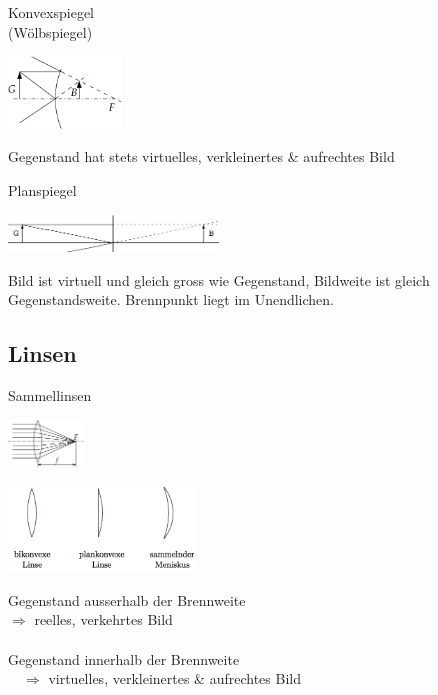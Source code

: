 \begin{minipage}[]{3.5cm}
  Konvexspiegel\\
  (Wölbspiegel)
\end{minipage}
\begin{minipage}[]{7cm}
  \includegraphics[width=3cm]{./bilder/Konvexspiegel.png}
\end{minipage}
\begin{minipage}[]{8cm}
  \small
  Gegenstand hat stets virtuelles, verkleinertes \& aufrechtes Bild
\end{minipage}

\begin{minipage}[]{3.5cm}
  Planspiegel
\end{minipage}
\begin{minipage}[]{7cm}
  \includegraphics[height=1cm]{./bilder/Planspiegel.png}
\end{minipage}
\begin{minipage}[]{8cm}
  \small
  Bild ist virtuell und gleich gross wie Gegenstand, Bildweite ist gleich
  Gegenstandsweite. Brennpunkt liegt im Unendlichen.
\end{minipage}

\subsection{Linsen  }
\begin{minipage}[]{3.5cm}
  Sammellinsen
\end{minipage}
\begin{minipage}[]{2cm}
  \includegraphics[width=2cm]{./bilder/sammelprinzip.png}
\end{minipage}
\begin{minipage}[]{5cm}
  \includegraphics[width=5cm]{./bilder/sammellinsen.png}
\end{minipage}
\begin{minipage}[]{7.5cm}
  \small
  Gegenstand ausserhalb der Brennweite \\
  $\Rightarrow$ reelles, verkehrtes Bild \\ \\
  Gegenstand innerhalb der Brennweite \\
  $\quad \Rightarrow$ virtuelles, verkleinertes \& aufrechtes Bild
\end{minipage}

